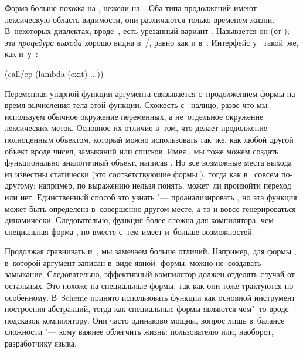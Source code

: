 Форма  больше похожа на , нежели на~. Оба типа
продолжений имеют лексическую область видимости, они различаются только временем
жизни. В~некоторых диалектах, вроде~\cite{im89}, есть урезанный вариант
. Называется он  (от );
эта \emph{процедура выхода} хорошо видна в~/, равно
как и в~. Интерфейс у~ такой~же, как и~у~:

\begin{code:lisp}
(call/ep (lambda (exit) ...))
\end{code:lisp}

Переменная  унарной функции-аргумента связывается с~продолжением формы
 на время вычисления тела этой функции. Схожесть с~
налицо, разве что мы используем обычное окружение переменных, а не~отдельное
окружение лексических меток. Основное их отличие в~том, что  делает
продолжение полноценным объектом, который можно использовать так~же, как любой
другой объект вроде чисел, замыканий или списков. Имея , мы тоже можем
создать функционально аналогичный объект, написав . Но все возможные места выхода из  известны статически
(это соответствующие формы ), тогда как в~ совсем
по-другому: например, по выражению  нельзя понять, может~ли
произойти переход или нет. Единственный способ это узнать "--- проанализировать
, но эта функция может быть определена в~совершенно другом месте, а то и
вовсе генерироваться динамически. Следовательно, функция  более
сложна для компилятора, чем специальная форма , но вместе с~тем имеет
и~больше возможностей.

Продолжая сравнивать  и~, мы замечаем больше отличий.
Например, для формы , в~которой аргумент записан в~виде явной
-формы, можно не~создавать замыкание. Следовательно, эффективный
компилятор должен отделять случай  от остальных. Это
похоже на специальные формы, так как они тоже трактуются по-особенному. В~Scheme
принято использовать функции как основной инструмент построения абстракций,
тогда как специальные формы являются чем"~то вроде подсказок компилятору. Они
часто одинаково мощны, вопрос лишь в~балансе сложности "--- кому важнее
облегчить жизнь: пользователю или, наоборот, разработчику языка.

